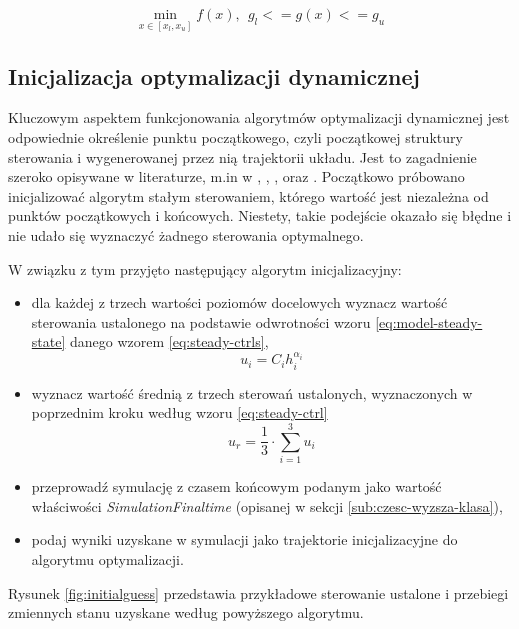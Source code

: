 \begin{equation}\label{eq:opt-stat}
    \min\limits_{x \in [x_{l}, x_{u}]} f(x),~~ g_{l} <= g(x) <= g_{u}
\end{equation}


\subsection{Inicjalizacja optymalizacji dynamicznej}
\label{sub:opt-init}

Kluczowym aspektem funkcjonowania algorytmów optymalizacji dynamicznej jest odpowiednie określenie punktu początkowego, czyli początkowej struktury sterowania i wygenerowanej przez nią trajektorii układu. Jest to zagadnienie szeroko opisywane w literaturze, m.in w \cite{Betts98}, \cite{Rao2010}, \cite{Korytowski2015}, \cite{cas+11ifac} oraz \cite{JModelicaUserGuide}.
Początkowo próbowano inicjalizować algorytm stałym sterowaniem, którego wartość jest niezależna od punktów początkowych i końcowych. Niestety, takie podejście okazało się błędne i nie udało się wyznaczyć żadnego sterowania optymalnego.

W związku z tym przyjęto następujący algorytm inicjalizacyjny:
\begin{itemize}
    \item dla każdej z trzech wartości poziomów docelowych wyznacz wartość sterowania ustalonego na podstawie odwrotności wzoru \ref{eq:model-steady-state} danego wzorem \ref{eq:steady-ctrls},
    \begin{equation} \label{eq:steady-ctrls}
    u_{i} = C_{i}h_{i}^{\alpha_{i}}
    \end{equation}
    \item wyznacz wartość średnią z trzech sterowań ustalonych, wyznaczonych w poprzednim kroku według wzoru \ref{eq:steady-ctrl}
    \begin{equation}\label{eq:steady-ctrl}
    u_{r} = \frac{1}{3} \cdot \sum_{i=1}^{3} u_{i}
    \end{equation}
    \item przeprowadź symulację z czasem końcowym podanym jako wartość właściwości \emph{SimulationFinaltime} (opisanej w sekcji \ref{sub:czesc-wyzsza-klasa}),
    \item podaj wyniki uzyskane w symulacji jako trajektorie inicjalizacyjne do algorytmu optymalizacji.
\end{itemize}

Rysunek \ref{fig:initialguess} przedstawia przykładowe sterowanie ustalone i przebiegi zmiennych stanu uzyskane według powyższego algorytmu.

